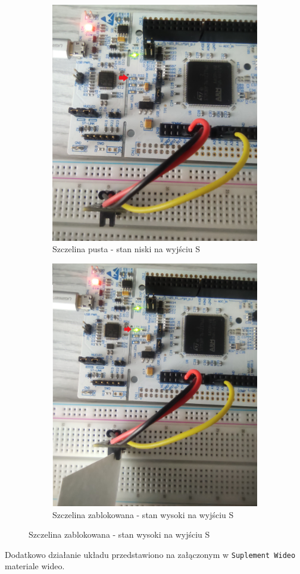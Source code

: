 \documentclass[11pt, a4paper]{article}
\begin{document}
\vspace{0.25cm}
\begin{figure}[h]
\centering
\begin{subfigure}{.5\textwidth}
\centering
\includegraphics[width=.76\linewidth]{fig/HW-487/działanie_ukladu/led_off.jpg}
\caption{Szczelina pusta - stan niski na wyjściu S}
\label{fig:_uklad_off}
\end{subfigure}%
\begin{subfigure}{.5\textwidth}
\centering
\includegraphics[width=.74\linewidth]{fig/HW-487/działanie_ukladu/led_on.jpg}
\caption{Szczelina zablokowana - stan wysoki na wyjściu S}
\label{fig:_uklad_on}
\end{subfigure}
\label{fig:mikroproc}
\end{figure}
\vspace{0.25cm}
Dodatkowo działanie układu przedstawiono na załączonym w \texttt{Suplement Wideo} materiale 
wideo.

\newpage
\printbibliography[heading=bibintoc]
\end{document}
